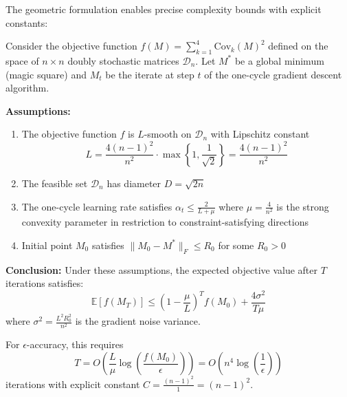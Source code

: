The geometric formulation enables precise complexity bounds with explicit constants:

\begin{theorem}
\label{thm:convergence-rate}
Consider the objective function $f(M) = \sum_{k=1}^4 \text{Cov}_k(M)^2$ defined on the space of $n \times n$ doubly stochastic matrices $\mathcal{D}_n$. Let $M^*$ be a global minimum (magic square) and $M_t$ be the iterate at step $t$ of the one-cycle gradient descent algorithm.

\textbf{Assumptions:}
\begin{enumerate}
    \item The objective function $f$ is $L$-smooth on $\mathcal{D}_n$ with Lipschitz constant 
    \begin{equation}
    L = \frac{4(n-1)^2}{n^2} \cdot \max\left\{1, \frac{1}{\sqrt{2}}\right\} = \frac{4(n-1)^2}{n^2}
    \end{equation}
    
    \item The feasible set $\mathcal{D}_n$ has diameter $D = \sqrt{2n}$
    
    \item The one-cycle learning rate satisfies $\alpha_t \leq \frac{2}{L+\mu}$ where $\mu = \frac{4}{n^2}$ is the strong convexity parameter in restriction to constraint-satisfying directions
    
    \item Initial point $M_0$ satisfies $\|M_0 - M^*\|_F \leq R_0$ for some $R_0 > 0$
\end{enumerate}

\textbf{Conclusion:}
Under these assumptions, the expected objective value after $T$ iterations satisfies:
\begin{equation}
\mathbb{E}[f(M_T)] \leq \left(1 - \frac{\mu}{L}\right)^T f(M_0) + \frac{4\sigma^2}{T\mu}
\end{equation}
where $\sigma^2 = \frac{L^2 R_0^2}{n^2}$ is the gradient noise variance.

For $\epsilon$-accuracy, this requires
\begin{equation}
T = O\left(\frac{L}{\mu} \log\left(\frac{f(M_0)}{\epsilon}\right)\right) = O\left(n^4 \log\left(\frac{1}{\epsilon}\right)\right)
\end{equation}
iterations with explicit constant $C = \frac{(n-1)^2}{1} = (n-1)^2$.
\end{theorem}

